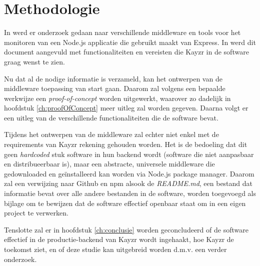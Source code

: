 \chapter{Methodologie}
\label{ch:methodologie}



In \textit{} werd er onderzoek gedaan naar verschillende middleware en tools voor het monitoren van een Node.js applicatie die gebruikt maakt van Express. In \textit{} werd dit document aangevuld met functionaliteiten en vereisten die Kayzr in de software graag wenst te zien. 

Nu dat al de nodige informatie is verzameld, kan het ontwerpen van de middleware toepassing van start gaan. Daarom zal volgens een bepaalde werkwijze een \textit{proof-of-concept} worden uitgewerkt, waarover zo dadelijk in hoofdstuk \ref{ch:proofOfConcept} meer uitleg zal worden gegeven. Daarna volgt er een uitleg van de verschillende functionaliteiten die de software bevat.

Tijdens het ontwerpen van de middleware zal echter niet enkel met de requirements van Kayzr rekening gehouden worden. Het is de bedoeling dat dit geen \textit{hardcoded} stuk software in hun backend wordt (software die niet aanpasbaar en distribueerbaar is), maar een abstracte, universele middleware die gedownloaded en geïnstalleerd kan worden via Node.js package manager. Daarom zal een verwijzing naar Github en npm alsook de \textit{README.md}, een bestand dat informatie bevat over alle andere bestanden in de software, worden toegevoegd als bijlage om te bewijzen dat de software effectief openbaar staat om in een eigen project te verwerken.

Tenslotte zal er in hoofdstuk \ref{ch:conclusie} worden geconcludeerd of de software effectief in de productie-backend van Kayzr wordt ingehaakt, hoe Kayzr de toekomst ziet, en of deze studie kan uitgebreid worden d.m.v. een verder onderzoek.  

